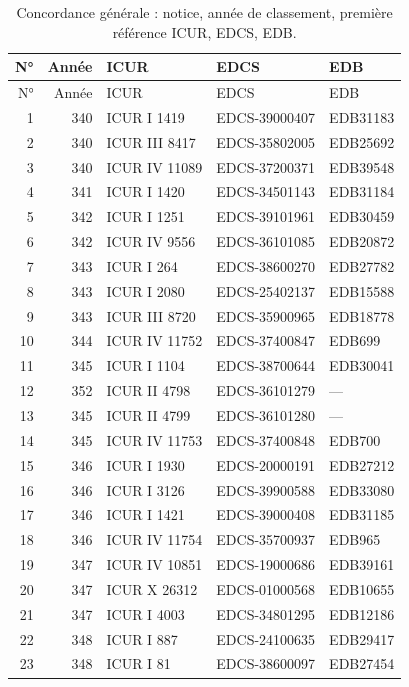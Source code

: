 \begin{longtable}{@{}r r l l l@{}}\caption{Concordance générale : notice, année de classement, première référence ICUR, EDCS, EDB.}\label{tab:concgen}\\\toprule N° & Année & ICUR & EDCS & EDB\\\midrule\endfirsthead\toprule N° & Année & ICUR & EDCS & EDB\\\midrule\endhead\bottomrule\endfoot
\footnotesize 1 & 340 & ICUR I 1419 & EDCS-39000407 & EDB31183 \\
2 & 340 & ICUR III 8417 & EDCS-35802005 & EDB25692 \\
3 & 340 & ICUR IV 11089 & EDCS-37200371 & EDB39548 \\
4 & 341 & ICUR I 1420 & EDCS-34501143 & EDB31184 \\
5 & 342 & ICUR I 1251 & EDCS-39101961 & EDB30459 \\
6 & 342 & ICUR IV 9556 & EDCS-36101085 & EDB20872 \\
7 & 343 & ICUR I 264 & EDCS-38600270 & EDB27782 \\
8 & 343 & ICUR I 2080 & EDCS-25402137 & EDB15588 \\
9 & 343 & ICUR III 8720 & EDCS-35900965 & EDB18778 \\
10 & 344 & ICUR IV 11752 & EDCS-37400847 & EDB699 \\
11 & 345 & ICUR I 1104 & EDCS-38700644 & EDB30041 \\
12 & 352 & ICUR II 4798 & EDCS-36101279 & — \\
13 & 345 & ICUR II 4799 & EDCS-36101280 & — \\
14 & 345 & ICUR IV 11753 & EDCS-37400848 & EDB700 \\
15 & 346 & ICUR I 1930 & EDCS-20000191 & EDB27212 \\
16 & 346 & ICUR I 3126 & EDCS-39900588 & EDB33080 \\
17 & 346 & ICUR I 1421 & EDCS-39000408 & EDB31185 \\
18 & 346 & ICUR IV 11754 & EDCS-35700937 & EDB965 \\
19 & 347 & ICUR IV 10851 & EDCS-19000686 & EDB39161 \\
20 & 347 & ICUR X 26312 & EDCS-01000568 & EDB10655 \\
21 & 347 & ICUR I 4003 & EDCS-34801295 & EDB12186 \\
22 & 348 & ICUR I 887 & EDCS-24100635 & EDB29417 \\
23 & 348 & ICUR I 81 & EDCS-38600097 & EDB27454 \\

\end{longtable}
